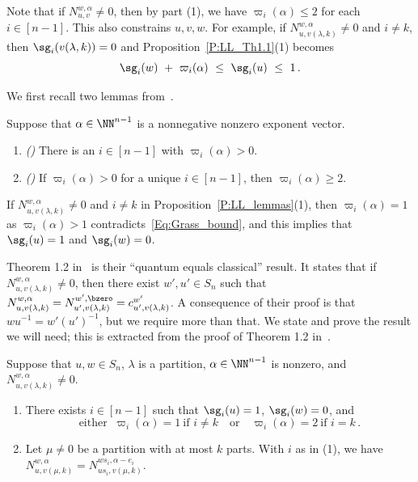 Note that if $N^{w,\alpha}_{u,v}\neq 0$, then by part (1), we have $\varpi_i(\alpha)\leq 2$ for each $i\in[n{-}1]$.
This also constrains $u,v,w$.
For example, if $N^{w,\alpha}_{u,v(\lambda,k)}\neq 0$ and $i\neq k$,  then $\sg_i(v(\lambda,k))=0$ and
Proposition~\ref{P:LL_Th1.1}(1) becomes 
\begin{equation}\label{Eq:Grass_bound}
  \sg_i(w)\ +\ \varpi_i(\alpha)\ \leq\ \sg_i(u)\ \leq\ 1\,.
\end{equation}

We first recall two lemmas from~\cite{LeungLi2012}.

\begin{proposition}\label{P:LL_lemmas}
   Suppose that $\alpha\in\NN^{n-1}$ is a nonnegative nonzero  exponent vector.
   \begin{enumerate}
   \item  \emph{(\cite[Lemma 2.8]{LeungLi2012})}
        There is an $i\in[n{-}1]$ with $\varpi_i(\alpha)>0$.
    \item  \emph{(\cite[Lemma 2.10]{LeungLi2012})}
        If $\varpi_i(\alpha)>0$ for a unique $i\in[n{-}1]$, then $\varpi_i(\alpha)\geq 2$.
   \end{enumerate}
\end{proposition}

If $N^{w,\alpha}_{u,v(\lambda,k)}\neq 0$ and $i\neq k$ in Proposition~\ref{P:LL_lemmas}(1), then $\varpi_i(\alpha)=1$ as
$\varpi_i(\alpha)>1$ 
contradicts~\eqref{Eq:Grass_bound}, and this implies that  $\sg_i(u)=1$ and $\sg_i(w)=0$.


Theorem 1.2 in~\cite{LeungLi2012} is their ``quantum equals classical'' result.
It states that if $N^{w, \alpha}_{u,v(\lambda,k)}\neq 0$, then there exist $w',u'\in S_n$ such
that  $N^{w, \alpha}_{u,v(\lambda,k)}=N^{w', {\bzero}}_{u',v(\lambda,k)}= c^{w'}_{u',v(\lambda,k)}$.
A consequence of their proof is that $w u^{-1}=w'(u')^{-1}$, but we require more than that.
We state and prove the result we will need; this is extracted from the proof of Theorem 1.2 in~\cite{LeungLi2012}.

\begin{proposition}\label{P:LLThm1.2}
  Suppose that $u,w\in S_n$, $\lambda$ is a partition, $\alpha\in\NN^{n-1}$ is nonzero, and $N^{w,\alpha}_{u,v(\lambda,k)}\neq 0$.
  \begin{enumerate}
  \item There exists $i\in[n{-}1]$ such that $\sg_i(u)=1$, $\sg_i(w)=0$, and
  \[
    \mbox{either }\ \varpi_i(\alpha) = 1\ \mbox{if }i\neq k
    \quad\mbox{or}\quad
    \varpi_i(\alpha) = 2\ \mbox{if }i= k    \,.
  \]

   \item Let $\mu\neq 0$ be a partition with at most $k$ parts.
          With $i$ as in (1), we have $N^{w,\alpha}_{u,v(\mu,k)}=N^{ws_i, \alpha-e_i}_{us_i,v(\mu,k)}$.
   \end{enumerate}
 \end{proposition}

